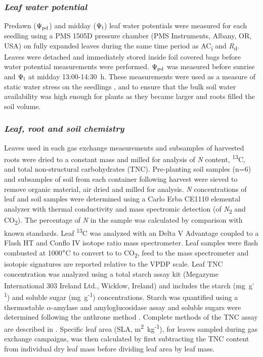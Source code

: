 \documentclass[a4paper]{article}\usepackage[]{graphicx}\usepackage[]{color}
\begin{document}
\subsubsection*{\textit{Leaf water potential}}

Predawn ($\Psi\textsubscript{pd}$) and midday ($\Psi\textsubscript{l}$) leaf water potentials were measured for each seedling using a PMS 1505D pressure chamber (PMS Instruments, Albany, OR, USA) on fully expanded leaves during the same time period as AC\textsubscript{i} and \textit{R}\textsubscript{d}. Leaves were detached and immediately stored inside foil covered bags before water potential measurements were performed. $\Psi\textsubscript{pd}$ was measured before sunrise and $\Psi\textsubscript{l}$ at midday 13:00-14:30~h. These measurements were used as a measure of static water stress on the seedlings \citep{sellin1999does}, and to ensure that the bulk soil water availability was high enough for plants as they became larger and roots filled the soil volume. 

\subsubsection*{\textit{Leaf, root and soil chemistry}}

Leaves used in each gas exchange measurements and subsamples of harvested roots were dried to a constant mass and milled for analysis of \textit{N} content, {\textdelta}\textsuperscript{13}C, and total non-structural carbohydrates (TNC). Pre-planting soil samples (n=6) and subsamples of soil from each container following harvest were sieved to remove organic material, air dried and milled for analysis. \textit{N} concentrations of leaf and soil samples were determined using a Carlo Erba CE1110 elemental analyzer with thermal conductivity and mass spectromic detection (of \textit{N}\textsubscript{2} and CO\textsubscript{2}).  The percentage of \textit{N} in the sample was calculated by comparison with known standards. Leaf {\textdelta}\textsuperscript{13}C was analyzed  with an Delta V Advantage coupled to a Flash HT and Conflo IV isotope ratio mass spectrometer. Leaf samples were flash combusted at 1000$\degree$C to convert to to CO\textsubscript{2}, feed to the mass spectrometer and isotopic signatures are reported relative to the VPDP scale. Leaf TNC concentration was analyzed using a total starch assay kit (Megazyme International 303 Ireland Ltd., Wicklow, Ireland) and includes the starch (mg~g\textsuperscript{-1}) and soluble sugar (mg~g\textsuperscript{-1}) concentrations. Starch was quantified using a thermostable $\alpha$-amylase and amyloglucosidase assay \citep{McCleary_starch} and soluble sugars were determined following the anthrone method \citep{ebell1969variation}. Complete methods of the TNC assay are described in \citep{mitchell2013drought}. Specific leaf area (SLA, m\textsuperscript{2}~kg\textsuperscript{-1}), for leaves sampled during gas exchange campaigns, was then calculated by first subtracting the TNC content from individual dry leaf mass before dividing leaf area by leaf mass.
\end{document}
